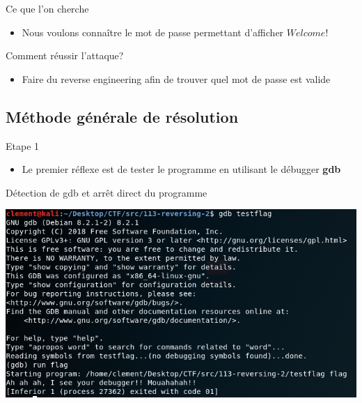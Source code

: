 \documentclass{beamer}
\begin{document}
\begin{frame}
\begin{block}{Ce que l'on cherche}
\begin{itemize}
\item Nous voulons connaître le mot de passe permettant d'afficher $Welcome!$ 
\end{itemize}
\end{block}
\begin{block}{Comment réussir l'attaque?}
\begin{itemize}
\item Faire du reverse engineering afin de trouver quel mot de passe est valide
\end{itemize}
\end{block}
\end{frame}

\subsection{Méthode générale de résolution}
\begin{frame}
\begin{block}{Etape 1}
\begin{itemize}
\item Le premier réflexe est de tester le programme en utilisant le débugger \textbf{gdb}
\end{itemize}
\end{block}
\begin{exampleblock}{Détection de gdb et arrêt direct du programme} 
\begin{center}
\includegraphics[scale=0.45]{./pictures/113-reversing-2-gdb-1.PNG}
\end{center}
\end{exampleblock}
\end{frame}
\end{document}
